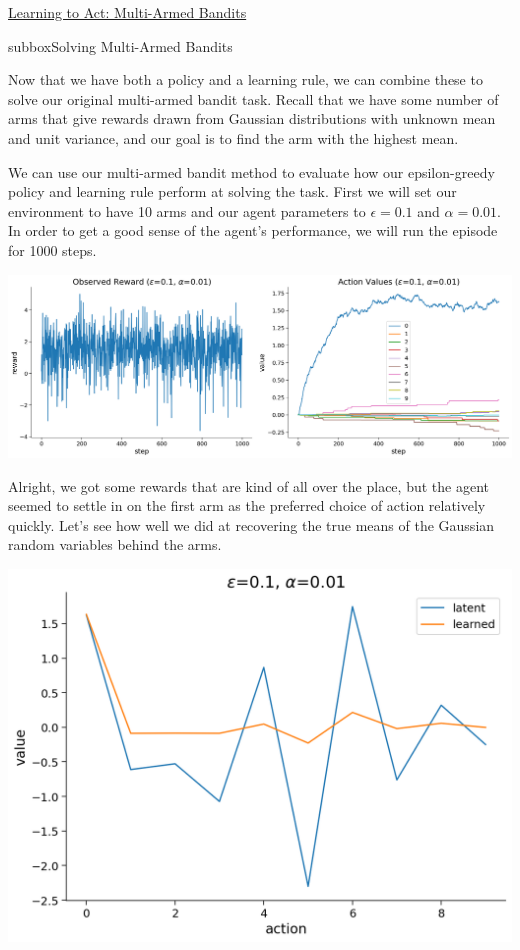 \begin{textbox}{\href{https://compneuro.neuromatch.io/tutorials/W3D4_ReinforcementLearning/student/W3D4_Tutorial2.html}{Learning to Act: Multi-Armed Bandits } }

\begin{subbox}{subbox}{Solving Multi-Armed Bandits}
\scriptsize

Now that we have both a policy and a learning rule, we can combine these to solve our original multi-armed bandit task. Recall that we have some number of arms that give rewards drawn from Gaussian distributions with unknown mean and unit variance, and our goal is to find the arm with the highest mean.

We can use our multi-armed bandit method to evaluate how our epsilon-greedy policy and learning rule perform at solving the task. First we will set our environment to have 10 arms and our agent parameters to $\epsilon=0.1$ and $\alpha=0.01$. In order to get a good sense of the agent's performance, we will run the episode for 1000 steps.
\begin{center}
    
\includegraphics[scale=0.15]{Figures/RL/RL_Figure9.png}
\end{center}

Alright, we got some rewards that are kind of all over the place, but the agent seemed to settle in on the first arm as the preferred choice of action relatively quickly. Let's see how well we did at recovering the true means of the Gaussian random variables behind the arms.
\begin{center}
    
\includegraphics[scale=0.15]{Figures/RL/RL_Figure10.png}
\end{center}



\end{subbox}
\end{textbox}
